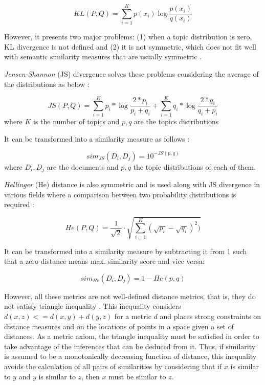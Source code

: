 \begin{equation}
KL(P,Q) = \sum\limits_{i=1}^K p(x_{i}) \log \frac{p(x_{i})}{q(x_{i})}
\label{eq:kl}
\end{equation}

However, it presents two major problems: (1) when a topic distribution is zero, KL divergence is not defined and (2) it is not symmetric, which does not fit well with semantic similarity measures that are usually symmetric \citep{Rus2013}.

\textit{Jensen-Shannon} (JS) divergence \citep{Rao1982,Lin1991} solves these problems considering the average of the distributions as below \citep{Celikyilmaz2010}:

\begin{equation}
JS(P,Q) = \sum\limits_{i=1}^K p_{i}*\log \frac{2*p_{i}}{p_{i}+q_{i}}  +  \sum\limits_{i=1}^K q_{i}*\log \frac{2*q_{i}}{q_{i}+p_{i}}
\label{eq:jsdivergence}
\end{equation}
where  $K$ is the number of topics and $p,q$ are the topics distributions

It can be transformed into a similarity measure as follows \citep{Dagan1998} :

\begin{equation}
sim_{JS}(D_i , D_j) = 10^{- JS(p,q)}
\label{eq:simjs}
\end{equation}
where  $D_i,D_j$ are the documents and $p,q$ the topic distributions of each of them.


\textit{Hellinger} (He) distance is also symmetric and is used along with JS divergence in various fields where a comparison between two probability distributions is required \citep{Blei2007a,Hall2008,Boyd-Graber2010}:

\begin{equation}
	He(P, Q) = \frac{1}{\sqrt{2}}\cdot\sqrt{\sum\limits_{i=1}^K (\sqrt{p_i} - \sqrt{q_i})^2)}
	\label{eq:hedistance}
\end{equation}

It can be transformed into a similarity measure by subtracting it from 1 \citep{Rus2013} such that a zero distance means max. similarity score and vice versa:

\begin{equation}
	sim_{He}(D_i, D_j) = 1 - He(p,q)
	\label{eq:simhe}
\end{equation}

However, all these metrics are not well-defined distance metrics, that is, they do not satisfy triangle inequality \citep{Charikar2002}. This inequality considers $d(x, z) <= d(x, y) + d(y, z)$ for a metric $d$ \citep{Griffiths2007} and places strong constraints on distance measures and on the locations of points in a space given a set of distances. As a metric axiom, the triangle inequality must be satisfied in order to take advantage of the inferences that can be deduced from it. Thus, if similarity is assumed to be a monotonically decreasing function of distance, this inequality avoids the calculation of all pairs of similarities by considering that if $x$ is similar to $y$ and $y$ is similar to $z$, then $x$ must be similar to $z$. 

